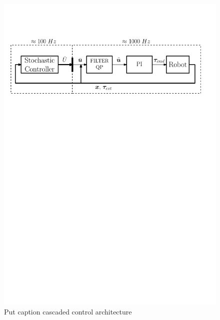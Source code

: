 \begin{figure}[t!]
\centering
\hspace*{-1.0cm}
\includegraphics[width=1.1\columnwidth]{figures/schemes/high_level_architecture.pdf}
\caption{Put caption cascaded control architecture} \label{fig:cascaded_architecture}
\end{figure}

